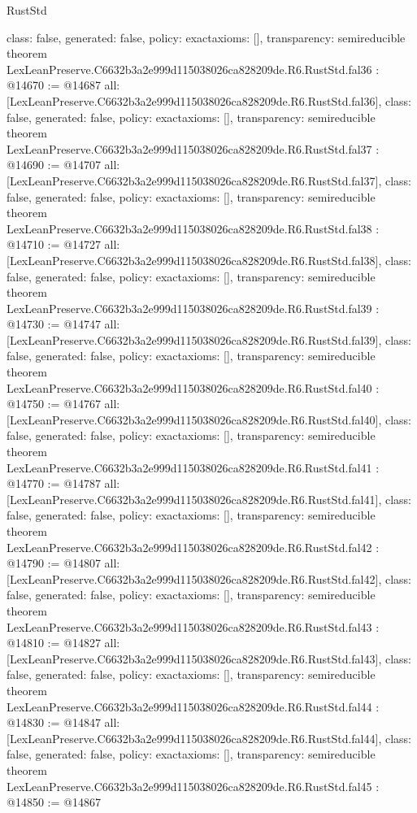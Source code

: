 \begin{lexlean}{RustStd}
\begin{coremodule}
{  class: false,
  generated: false,
  policy: exact{axioms: []},
  transparency: semireducible
}
theorem LexLeanPreserve.C6632b3a2e999d115038026ca828209de.R6.RustStd.fal36 : @14670 := @14687 {
  all: [LexLeanPreserve.C6632b3a2e999d115038026ca828209de.R6.RustStd.fal36],
  class: false,
  generated: false,
  policy: exact{axioms: []},
  transparency: semireducible
}
theorem LexLeanPreserve.C6632b3a2e999d115038026ca828209de.R6.RustStd.fal37 : @14690 := @14707 {
  all: [LexLeanPreserve.C6632b3a2e999d115038026ca828209de.R6.RustStd.fal37],
  class: false,
  generated: false,
  policy: exact{axioms: []},
  transparency: semireducible
}
theorem LexLeanPreserve.C6632b3a2e999d115038026ca828209de.R6.RustStd.fal38 : @14710 := @14727 {
  all: [LexLeanPreserve.C6632b3a2e999d115038026ca828209de.R6.RustStd.fal38],
  class: false,
  generated: false,
  policy: exact{axioms: []},
  transparency: semireducible
}
theorem LexLeanPreserve.C6632b3a2e999d115038026ca828209de.R6.RustStd.fal39 : @14730 := @14747 {
  all: [LexLeanPreserve.C6632b3a2e999d115038026ca828209de.R6.RustStd.fal39],
  class: false,
  generated: false,
  policy: exact{axioms: []},
  transparency: semireducible
}
theorem LexLeanPreserve.C6632b3a2e999d115038026ca828209de.R6.RustStd.fal40 : @14750 := @14767 {
  all: [LexLeanPreserve.C6632b3a2e999d115038026ca828209de.R6.RustStd.fal40],
  class: false,
  generated: false,
  policy: exact{axioms: []},
  transparency: semireducible
}
theorem LexLeanPreserve.C6632b3a2e999d115038026ca828209de.R6.RustStd.fal41 : @14770 := @14787 {
  all: [LexLeanPreserve.C6632b3a2e999d115038026ca828209de.R6.RustStd.fal41],
  class: false,
  generated: false,
  policy: exact{axioms: []},
  transparency: semireducible
}
theorem LexLeanPreserve.C6632b3a2e999d115038026ca828209de.R6.RustStd.fal42 : @14790 := @14807 {
  all: [LexLeanPreserve.C6632b3a2e999d115038026ca828209de.R6.RustStd.fal42],
  class: false,
  generated: false,
  policy: exact{axioms: []},
  transparency: semireducible
}
theorem LexLeanPreserve.C6632b3a2e999d115038026ca828209de.R6.RustStd.fal43 : @14810 := @14827 {
  all: [LexLeanPreserve.C6632b3a2e999d115038026ca828209de.R6.RustStd.fal43],
  class: false,
  generated: false,
  policy: exact{axioms: []},
  transparency: semireducible
}
theorem LexLeanPreserve.C6632b3a2e999d115038026ca828209de.R6.RustStd.fal44 : @14830 := @14847 {
  all: [LexLeanPreserve.C6632b3a2e999d115038026ca828209de.R6.RustStd.fal44],
  class: false,
  generated: false,
  policy: exact{axioms: []},
  transparency: semireducible
}
theorem LexLeanPreserve.C6632b3a2e999d115038026ca828209de.R6.RustStd.fal45 : @14850 := @14867 {
}
\end{coremodule}
\end{lexlean}
